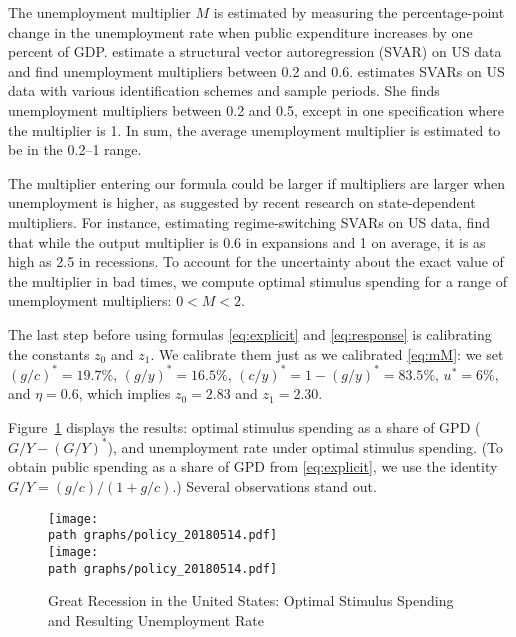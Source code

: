 \documentclass[letterpaper,12pt,leqno]{article}
\begin{document}
\begin{bibunit}
The unemployment multiplier $M$ is estimated by measuring the percentage-point change in the unemployment rate when public expenditure increases by one percent of GDP.  estimate a structural vector autoregression (SVAR) on US data and find unemployment multipliers between 0.2 and 0.6.  estimates SVARs on US data with various identification schemes and sample periods. She finds unemployment multipliers between 0.2 and 0.5, except in one specification where the multiplier is 1. In sum, the average unemployment multiplier is estimated to be in the 0.2--1 range.

The multiplier entering our formula could be larger if multipliers are larger when unemployment is higher, as suggested by recent research on state-dependent multipliers. For instance, estimating regime-switching SVARs on US data,  find that while the output multiplier is 0.6 in expansions and 1 on average, it is as high as 2.5 in recessions. To account for the uncertainty about the exact value of the multiplier in bad times, we compute optimal stimulus spending for a range of unemployment multipliers: $0 < M < 2$.

The last step before using formulas \eqref{eq:explicit} and \eqref{eq:response} is calibrating the constants $z_0$ and $z_1$. We calibrate them just as we calibrated \eqref{eq:mM}: we set $(g/c)^*=19.7\%$, $(g/y)^*=16.5\%$, $(c/y)^* =1-(g/y)^* =83.5\%$, $u^*=6\%$, and $\eta=0.6$, which implies $z_0=2.83$ and $z_1=2.30$. 

Figure~\ref{fig:optimal} displays the results: optimal stimulus spending as a share of GPD ($G/Y-(G/Y)^*$), and unemployment rate under optimal stimulus spending. (To obtain public spending as a share of GPD from \eqref{eq:explicit}, we use the identity $G/Y = (g/c)/(1+g/c)$.) Several observations stand out.

\begin{figure}[p] \centering
\texttt{[image: \\path graphs/policy\_20180514.pdf]}\\
\texttt{[image: \\path graphs/policy\_20180514.pdf]}
\caption{Great Recession in the United States: Optimal Stimulus Spending and Resulting Unemployment Rate}
\label{fig:optimal}\end{figure}


\end{bibunit}
\end{document}
